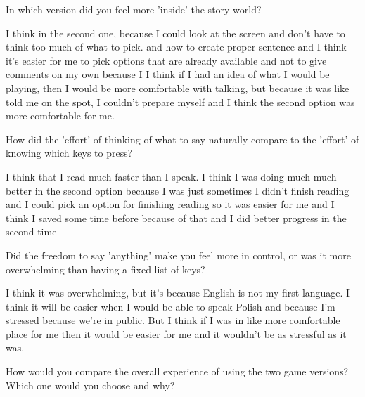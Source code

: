 \begin{QandA}
   \item In which version did you feel more 'inside' the story world?
         \begin{answered}
            I think in the second one, because I could look at the screen and don't have to think too much of what to pick.
            and how to create proper sentence and I think it's easier for me to pick options that are already available and not to give comments on my own because I
            I think if I had an idea of what I would be playing, then I would be more comfortable with talking, but because it was like told me on the spot, I couldn't prepare myself and I think the second option was more comfortable for me.

           
         \end{answered}

   \item How did the 'effort' of thinking of what to say naturally compare to the 'effort' of knowing which keys to press?

         \begin{answered}
            I think that I read much faster than I speak.
            I think I was doing much much better in the second option because I was just sometimes I didn't finish reading and I could pick an option for finishing reading so it was easier for me and I think I saved some time before because of that and I did better progress in the second time
         \end{answered}

    \item Did the freedom to say 'anything' make you feel more in control, or was it more overwhelming than having a fixed list of keys?

         \begin{answered}
            I think it was overwhelming, but it's because English is not my first language.
            I think it will be easier when I would
            be able to speak Polish and because I'm stressed because we're in public.
            But I think if I was in like more comfortable place for me then it would be easier for me and it wouldn't be as stressful as it was.
         \end{answered}
    \item How would you compare the overall experience of using the two game versions? Which one would you choose and why?


\end{QandA}
